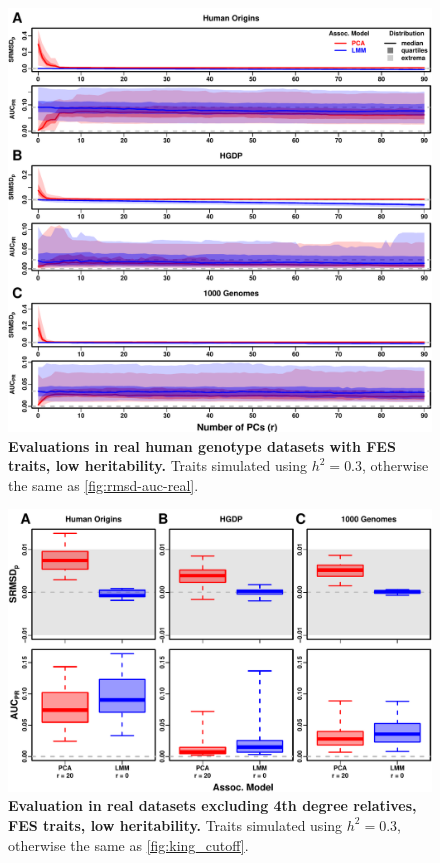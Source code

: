\documentclass[11pt]{article}
\begin{document}
\begin{figure}[hp!]
  \centering
  \includegraphics[width=\textwidth,height=\textheight,keepaspectratio]{fes/m_causal_fac-27/h0.3/rmsd-auc-real.pdf}
  \caption{
    {\bf Evaluations in real human genotype datasets with FES traits, low heritability.}
    Traits simulated using $h^2=0.3$, otherwise the same as \cref{fig:rmsd-auc-real}.
  }
  \label{fig:rmsd-auc-real-fes-h3}
\end{figure}

\begin{figure}[hp]
  \centering
  \includegraphics[width=\textwidth]{fes/m_causal_fac-27/h0.3/rmsd-auc_king-cutoff-4.pdf}
  \caption{
    {\bf Evaluation in real datasets excluding 4th degree relatives, FES traits, low heritability.}
    Traits simulated using $h^2=0.3$, otherwise the same as \cref{fig:king_cutoff}.
  }
  \label{fig:king_cutoff-h3}
\end{figure}
\end{document}
